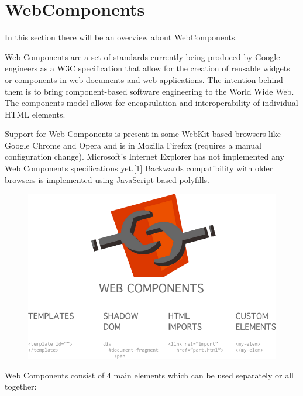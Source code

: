 \section{WebComponents}
\label{sec:TCH_webcomponents}

In this section there will be an overview about WebComponents.

Web Components are a set of standards currently being produced by Google engineers as a W3C specification that allow for the creation of reusable widgets or components in web documents and web applications. The intention behind them is to bring component-based software engineering to the World Wide Web. The components model allows for encapsulation and interoperability of individual HTML elements.

Support for Web Components is present in some WebKit-based browsers like Google Chrome and Opera and is in Mozilla Firefox (requires a manual configuration change). Microsoft's Internet Explorer has not implemented any Web Components specifications yet.[1] Backwards compatibility with older browsers is implemented using JavaScript-based polyfills.\cite{tch_webcomp}

\begin {figure}[h]
\graphicspath{{images/chapter_TCH/}}
\includegraphics[width=\textwidth]{webcomponents_1}
\end {figure}

Web Components consist of 4 main elements which can be used separately or all together:

